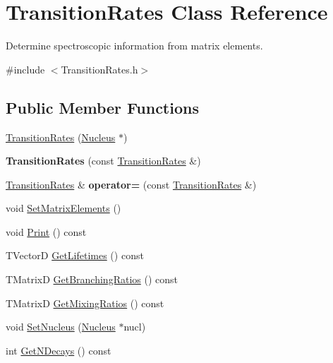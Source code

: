 \hypertarget{classTransitionRates}{\section{Transition\-Rates Class Reference}
\label{classTransitionRates}
}


Determine spectroscopic information from matrix elements.  




{\ttfamily \#include $<$Transition\-Rates.\-h$>$}

\subsection*{Public Member Functions}
\begin{DoxyCompactItemize}
\item 
\hyperlink{classTransitionRates_ad00aaf48b7c94926a5c9f0b0d03b42c8}{Transition\-Rates} (\hyperlink{classNucleus}{Nucleus} $\ast$)
\item 
\hypertarget{classTransitionRates_a9717bbd31eff3931a0f2cdb545c9224d}{{\bfseries Transition\-Rates} (const \hyperlink{classTransitionRates}{Transition\-Rates} \&)}\label{classTransitionRates_a9717bbd31eff3931a0f2cdb545c9224d}

\item 
\hypertarget{classTransitionRates_ac2a000813227d0b9e0d082e7dc336524}{\hyperlink{classTransitionRates}{Transition\-Rates} \& {\bfseries operator=} (const \hyperlink{classTransitionRates}{Transition\-Rates} \&)}\label{classTransitionRates_ac2a000813227d0b9e0d082e7dc336524}

\item 
void \hyperlink{classTransitionRates_a7601fbf2a719b9da760224c6204157fa}{Set\-Matrix\-Elements} ()
\item 
void \hyperlink{classTransitionRates_aa6b4319cdf1d3fe9a983df698b3a4b20}{Print} () const 
\item 
T\-Vector\-D \hyperlink{classTransitionRates_afe1e8c779441b1d54debf169fcd6936e}{Get\-Lifetimes} () const 
\item 
T\-Matrix\-D \hyperlink{classTransitionRates_a187b19b9f3da2d284644455ece9b5204}{Get\-Branching\-Ratios} () const 
\item 
T\-Matrix\-D \hyperlink{classTransitionRates_a7bd21177c625ea6e51c45ef66bd28275}{Get\-Mixing\-Ratios} () const 
\item 
void \hyperlink{classTransitionRates_a667cc48402a7a5b06826b3c9993d0ca2}{Set\-Nucleus} (\hyperlink{classNucleus}{Nucleus} $\ast$nucl)
\item 
int \hyperlink{classTransitionRates_a31184f9d66260f0575a2f5c1be7683f4}{Get\-N\-Decays} () const 
\end{DoxyCompactItemize}


